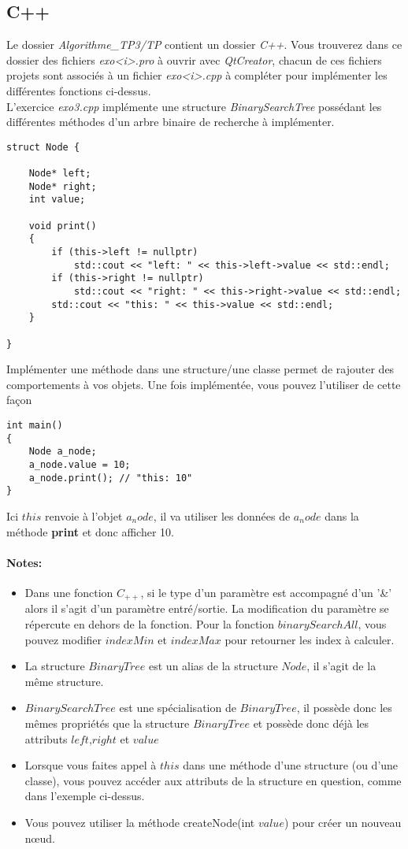 \documentclass[11pt]{extarticle}
\begin{document}
\subsection{C++}
Le dossier \textit{Algorithme\_TP3/TP} contient un dossier \textit{C++}. Vous trouverez dans ce dossier des fichiers \textit{exo<i>.pro} à ouvrir avec \textit{QtCreator}, chacun de ces fichiers projets sont associés à un fichier \textit{exo<i>.cpp} à compléter pour implémenter les différentes fonctions ci-dessus. \\
L'exercice \textit{exo3.cpp} implémente une structure \textit{BinarySearchTree} possédant les différentes méthodes d'un arbre binaire de recherche à implémenter.
\begin{lstlisting}[style=customc, escapechar=@]
struct Node {
	
	Node* left;
	Node* right;	
	int value;
	
	void print()
	{
		if (this->left != nullptr)
			std::cout << "left: " << this->left->value << std::endl;
		if (this->right != nullptr)
			std::cout << "right: " << this->right->value << std::endl;
		std::cout << "this: " << this->value << std::endl;
	}

}
\end{lstlisting}
Implémenter une méthode dans une structure/une classe permet de rajouter des comportements à vos objets. Une fois implémentée, vous pouvez l'utiliser de cette façon
\begin{lstlisting}[style=customc, escapechar=@]
int main()
{
	Node a_node;
	a_node.value = 10;
	a_node.print(); // "this: 10"
}
\end{lstlisting}
Ici \textbf{$this$} renvoie à l'objet $a_node$, il va utiliser les données de $a_node$ dans la méthode \textbf{print} et donc afficher 10.
\paragraph{Notes:} 
\begin{itemize}
\item Dans une fonction $C_{++}$, si le type d'un paramètre est accompagné d'un '\&' alors il s'agit d'un paramètre entré/sortie. La modification du paramètre se répercute en dehors de la fonction. Pour la fonction $binarySearchAll$, vous pouvez modifier $indexMin$ et $indexMax$ pour retourner les index à calculer. 
\item La structure $BinaryTree$ est un alias de la structure $Node$, il s'agit de la même structure.
\item $BinarySearchTree$ est une spécialisation de $BinaryTree$, il possède donc les mêmes propriétés que la structure $BinaryTree$ et possède donc déjà les attributs $left$,$right$ et $value$
\item Lorsque vous faites appel à $this$ dans une méthode d'une structure (ou d'une classe), vous pouvez accéder aux attributs de la structure en question, comme dans l'exemple ci-dessus.
\item Vous pouvez utiliser la méthode createNode(int $value$) pour créer un nouveau nœud.
\end{itemize}
\end{document}
